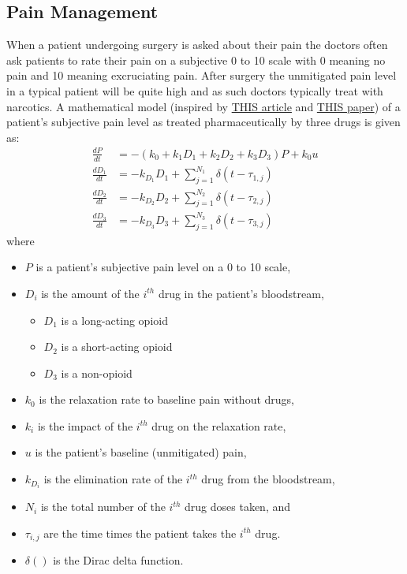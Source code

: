 \documentclass[
]{book}
\theoremstyle{definition}
\theoremstyle{definition}
\theoremstyle{definition}
\theoremstyle{remark}
\begin{document}
\hypertarget{pain-management}{%
\subsection{Pain Management}\label{pain-management}}

When a patient undergoing surgery is asked about their pain the doctors
often ask patients to rate their pain on a subjective 0 to 10 scale with
0 meaning no pain and 10 meaning excruciating pain. After surgery the
unmitigated pain level in a typical patient will be quite high and as
such doctors typically treat with narcotics. A mathematical model
(inspired by \href{https://sinews.siam.org/Details-Page/data-driven-chronic-pain-management-using-hybrid-mathematical-methods}{THIS
article}
and \href{https://arxiv.org/pdf/1706.02366.pdf}{THIS paper}) of a patient's
subjective pain level as treated pharmaceutically by three drugs is
given as: \[\begin{aligned}
    \frac{dP}{dt} &= - \left( k_0 + k_1 D_1 + k_2 D_2 +k_3 D_3\right)P + k_0 u \\
    \frac{dD_1}{dt} &= -k_{D_1} D_1 + \sum_{j=1}^{N_1} \delta (t-\tau_{1,j}) \\ 
    \frac{dD_2}{dt} &= -k_{D_2} D_2 + \sum_{j=1}^{N_2} \delta (t-\tau_{2,j}) \\ 
    \frac{dD_3}{dt} &= -k_{D_3} D_3 + \sum_{j=1}^{N_3} \delta (t-\tau_{3,j})  \end{aligned}\]
where

\begin{itemize}
\item
  \(P\) is a patient's subjective pain level on a 0 to 10 scale,
\item
  \(D_i\) is the amount of the \(i^{th}\) drug in the patient's
  bloodstream,

  \begin{itemize}
  \item
    \(D_1\) is a long-acting opioid
  \item
    \(D_2\) is a short-acting opioid
  \item
    \(D_3\) is a non-opioid
  \end{itemize}
\item
  \(k_0\) is the relaxation rate to baseline pain without drugs,
\item
  \(k_i\) is the impact of the \(i^{th}\) drug on the relaxation rate,
\item
  \(u\) is the patient's baseline (unmitigated) pain,
\item
  \(k_{D_i}\) is the elimination rate of the \(i^{th}\) drug from the
  bloodstream,
\item
  \(N_i\) is the total number of the \(i^{th}\) drug doses taken, and
\item
  \(\tau_{i,j}\) are the time times the patient takes the \(i^{th}\) drug.
\item
  \(\delta()\) is the Dirac delta function.
\end{itemize}
\end{document}
